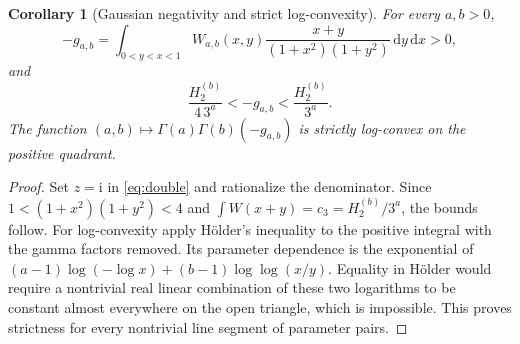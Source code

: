 \documentclass[11pt]{article}
\numberwithin{equation}{section}
\newtheorem{corollary}[theorem]{Corollary}
\theoremstyle{definition}\newtheorem{definition}[theorem]{Definition}
\theoremstyle{remark}\newtheorem{remark}[theorem]{Remark}
\newcommand{\dd}{\,\mathrm d}
\newcommand{\ii}{\mathrm i}
\begin{document}
\begin{corollary}[Gaussian negativity and strict log-convexity]
\label{cor:gaussian}
For every $a,b>0$,
\begin{equation}\label{eq:gaussianpositive}
 -g_{a,b}=\int_{0<y<x<1}W_{a,b}(x,y)
       \frac{x+y}{(1+x^2)(1+y^2)}\dd y\dd x>0,
\end{equation}
and
\begin{equation}\label{eq:gaussianbounds}
 \frac{H_2^{(b)}}{4\,3^a}<-g_{a,b}<\frac{H_2^{(b)}}{3^a}.
\end{equation}
The function $(a,b)\mapsto\Gamma(a)\Gamma(b)(-g_{a,b})$ is strictly
log-convex on the positive quadrant.
\end{corollary}
\begin{proof}
Set $z=\ii$ in \eqref{eq:double} and rationalize the denominator.
Since $1<(1+x^2)(1+y^2)<4$ and
$\int W(x+y)=c_3=H_2^{(b)}/3^a$, the bounds follow.
For log-convexity apply H\"older's inequality to the positive integral
with the gamma factors removed. Its parameter dependence is the
exponential of
$(a-1)\log(-\log x)+(b-1)\log\log(x/y)$.
Equality in H\"older would require a nontrivial real linear combination
of these two logarithms to be constant almost everywhere on the open
triangle, which is impossible. This proves strictness for every
nontrivial line segment of parameter pairs.
\end{proof}
\end{document}
